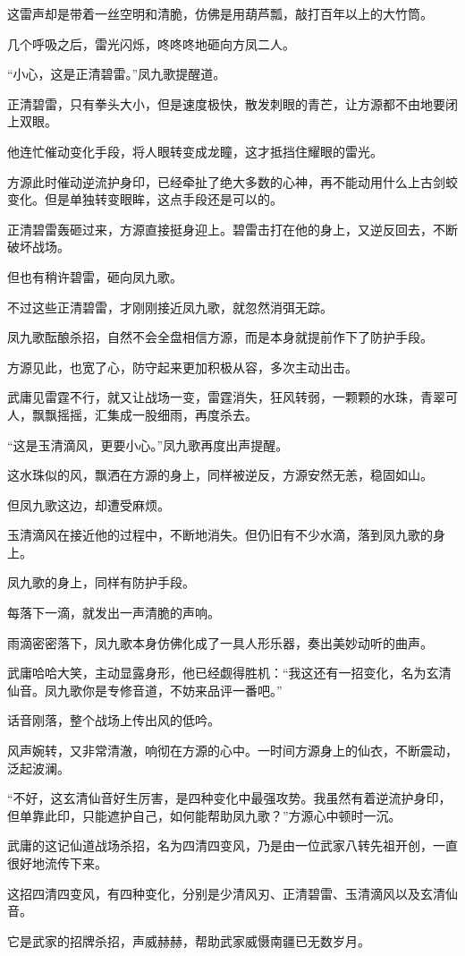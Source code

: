 \begin{this_body}
这雷声却是带着一丝空明和清脆，仿佛是用葫芦瓢，敲打百年以上的大竹筒。

几个呼吸之后，雷光闪烁，咚咚咚地砸向方凤二人。

“小心，这是正清碧雷。”凤九歌提醒道。

正清碧雷，只有拳头大小，但是速度极快，散发刺眼的青芒，让方源都不由地要闭上双眼。

他连忙催动变化手段，将人眼转变成龙瞳，这才抵挡住耀眼的雷光。

方源此时催动逆流护身印，已经牵扯了绝大多数的心神，再不能动用什么上古剑蛟变化。但是单独转变眼眸，这点手段还是可以的。

正清碧雷轰砸过来，方源直接挺身迎上。碧雷击打在他的身上，又逆反回去，不断破坏战场。

但也有稍许碧雷，砸向凤九歌。

不过这些正清碧雷，才刚刚接近凤九歌，就忽然消弭无踪。

凤九歌酝酿杀招，自然不会全盘相信方源，而是本身就提前作下了防护手段。

方源见此，也宽了心，防守起来更加积极从容，多次主动出击。

武庸见雷霆不行，就又让战场一变，雷霆消失，狂风转弱，一颗颗的水珠，青翠可人，飘飘摇摇，汇集成一股细雨，再度杀去。

“这是玉清滴风，更要小心。”凤九歌再度出声提醒。

这水珠似的风，飘洒在方源的身上，同样被逆反，方源安然无恙，稳固如山。

但凤九歌这边，却遭受麻烦。

玉清滴风在接近他的过程中，不断地消失。但仍旧有不少水滴，落到凤九歌的身上。

凤九歌的身上，同样有防护手段。

每落下一滴，就发出一声清脆的声响。

雨滴密密落下，凤九歌本身仿佛化成了一具人形乐器，奏出美妙动听的曲声。

武庸哈哈大笑，主动显露身形，他已经觑得胜机：“我这还有一招变化，名为玄清仙音。凤九歌你是专修音道，不妨来品评一番吧。”

话音刚落，整个战场上传出风的低吟。

风声婉转，又非常清澈，响彻在方源的心中。一时间方源身上的仙衣，不断震动，泛起波澜。

“不好，这玄清仙音好生厉害，是四种变化中最强攻势。我虽然有着逆流护身印，但单靠此印，只能遮护自己，如何能帮助凤九歌？”方源心中顿时一沉。

武庸的这记仙道战场杀招，名为四清四变风，乃是由一位武家八转先祖开创，一直很好地流传下来。

这招四清四变风，有四种变化，分别是少清风刃、正清碧雷、玉清滴风以及玄清仙音。

它是武家的招牌杀招，声威赫赫，帮助武家威慑南疆已无数岁月。

\end{this_body}

